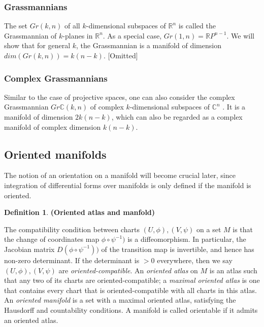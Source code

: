 \documentclass{article}
\theoremstyle{definition}
\newtheorem{defn}[theorem]{Definition}
\newenvironment{definition}
  {\vspace{8pt}\begin{mdframed}[backgroundcolor=blueish,innertopmargin=4]\begin{defn}}
  {\end{defn}\end{mdframed}\vspace{4pt}}
\begin{document}
\subsubsection{Grassmannians}
The set $Gr(k,n)$ of all $k$-dimensional subspaces of $\mathbb R^n$ is called the Grassmannian of $k$-planes in $\mathbb R^n$. As a special case, $Gr(1,n) = \mathbb RP^{n-1}$. We will show that for general $k$, the Grassmannian is a manifold of dimension $dim(Gr(k,n)) = k(n-k)$. [Omitted]

\subsubsection{Complex Grassmannians}

Similar to the case of projective spaces, one can also consider the complex Grassmannian $Gr \mathbb C(k,n)$ of complex $k$-dimensional subspaces of $\mathbb C^n$ . It is a manifold of dimension $2k(n-k)$, which can also be regarded as a complex manifold of complex dimension $k(n-k)$.

\subsection{Oriented manifolds}

The notion of an orientation on a manifold will become crucial later, since integration of differential forms over manifolds is only defined if the manifold is oriented.

\begin{definition} \textbf{(Oriented atlas and manfold)}

The compatibility condition between charts $(U,\phi),(V,\psi)$ on a set $M$ is that the change of coordinates map $\phi \circ \psi^{-1})$ is a diffeomorphism. In particular, the Jacobian matrix $D(\phi \circ \psi^{-1}))$ of the transition map is invertible, and hence has non-zero determinant.  If the determinant is $> 0$  everywhere, then we say $(U,\phi),(V,\psi)$ are \textit{oriented-compatible}.  An \textit{oriented atlas} on $M$ is an atlas such that any two of its charts are oriented-compatible; a \textit{maximal oriented atlas} is one that contains every chart that is oriented-compatible with all charts in this atlas. An \textit{oriented manifold} is a set with a maximal oriented atlas, satisfying the Hausdorff and countability conditions. A manifold is called orientable if it admits an oriented atlas.

\end{definition}
\end{document}
